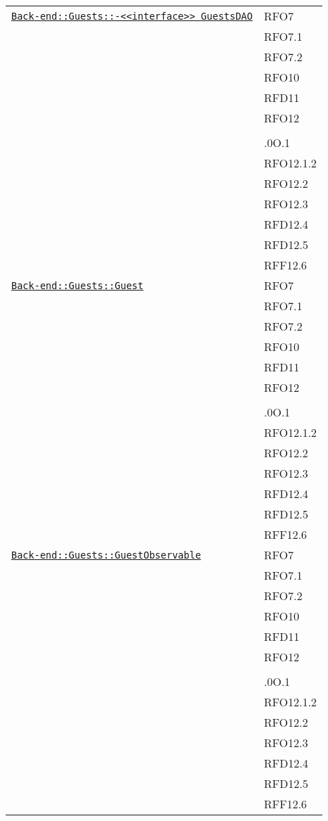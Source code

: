 \begin{longtable}{|>{\centering}m{10cm}|m{3cm}<{\centering}|}
\hyperref[Back-end::Guests::<<interface>> GuestsDAO]{\texttt{Back-end::Guests::-\linebreak <<interface>> GuestsDAO}} & RFO7\\
& RFO7.1\\
& RFO7.2\\
& RFO10\\
& RFD11\\
& RFO12\\
& \\
& .0O.1\\
& RFO12.1.2\\
& RFO12.2\\
& RFO12.3\\
& RFD12.4\\
& RFD12.5\\
& RFF12.6\\ \hline

\hyperref[Back-end::Guests::Guest]{\texttt{Back-end::Guests::Guest}} & RFO7\\
& RFO7.1\\
& RFO7.2\\
& RFO10\\
& RFD11\\
& RFO12\\
& \\
& .0O.1\\
& RFO12.1.2\\
& RFO12.2\\
& RFO12.3\\
& RFD12.4\\
& RFD12.5\\
& RFF12.6\\ \hline

\hyperref[Back-end::Guests::GuestObservable]{\texttt{Back-end::Guests::GuestObservable}} & RFO7\\
& RFO7.1\\
& RFO7.2\\
& RFO10\\
& RFD11\\
& RFO12\\
& \\
& .0O.1\\
& RFO12.1.2\\
& RFO12.2\\
& RFO12.3\\
& RFD12.4\\
& RFD12.5\\
& RFF12.6\\ \hline


\end{longtable}
